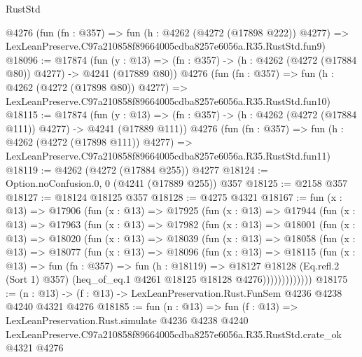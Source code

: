 \begin{lexlean}{RustStd}
\begin{coremodule}
    @4276
    (fun (fn : @357) =>
    fun (h : @4262 (@4272 (@17898 @222)) @4277) =>
    LexLeanPreserve.C97a210858f89664005cdba8257e6056a.R35.RustStd.fun9)
@18096 := @17874
    (fun (y : @13) => (fn : @357) -> (h : @4262 (@4272 (@17884 @80)) @4277) -> @4241 (@17889 @80))
    @4276
    (fun (fn : @357) =>
    fun (h : @4262 (@4272 (@17898 @80)) @4277) =>
    LexLeanPreserve.C97a210858f89664005cdba8257e6056a.R35.RustStd.fun10)
@18115 := @17874
    (fun (y : @13) => (fn : @357) -> (h : @4262 (@4272 (@17884 @111)) @4277) -> @4241 (@17889 @111))
    @4276
    (fun (fn : @357) =>
    fun (h : @4262 (@4272 (@17898 @111)) @4277) =>
    LexLeanPreserve.C97a210858f89664005cdba8257e6056a.R35.RustStd.fun11)
@18119 := @4262 (@4272 (@17884 @255)) @4277
@18124 := Option.noConfusion.{0, 0} (@4241 (@17889 @255)) @357
@18125 := @2158 @357
@18127 := @18124 @18125 @357
@18128 := @4275 @4321
@18167 := fun (x : @13) =>
  @17906
    (fun (x : @13) =>
    @17925
      (fun (x : @13) =>
      @17944
        (fun (x : @13) =>
        @17963
          (fun (x : @13) =>
          @17982
            (fun (x : @13) =>
            @18001
              (fun (x : @13) =>
              @18020
                (fun (x : @13) =>
                @18039
                  (fun (x : @13) =>
                  @18058
                    (fun (x : @13) =>
                    @18077
                      (fun (x : @13) =>
                      @18096
                        (fun (x : @13) =>
                        @18115
                          (fun (x : @13) =>
                          fun (fn : @357) =>
                          fun (h : @18119) =>
                          @18127
                            @18128
                            (Eq.refl.{2} (Sort 1) @357)
                            (heq_of_eq.{1} @4261 @18125 @18128 @4276)))))))))))))
@18175 := (n : @13) -> (f : @13) -> LexLeanPreservation.Rust.FunSem @4236 @4238 @4240 @4321 @4276
@18185 := fun (n : @13) =>
  fun (f : @13) =>
  LexLeanPreservation.Rust.simulate
    @4236
    @4238
    @4240
    LexLeanPreserve.C97a210858f89664005cdba8257e6056a.R35.RustStd.crate_ok
    @4321
    @4276
\end{coremodule}
\end{lexlean}
